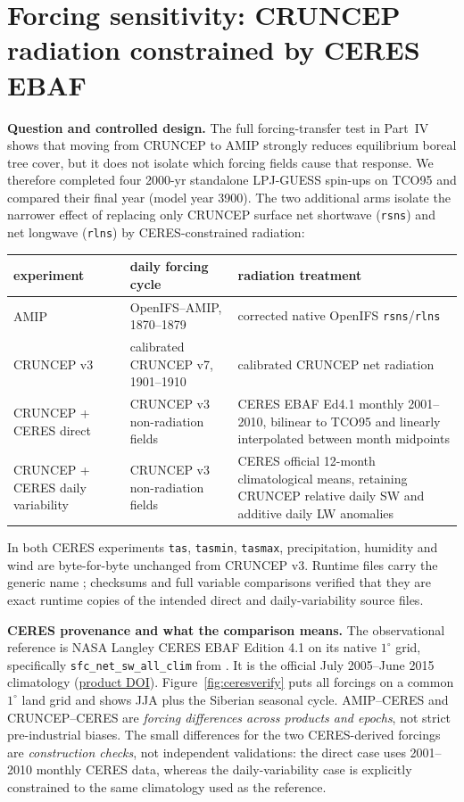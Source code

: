 \documentclass[10pt]{article}
\begin{document}
\section{Forcing sensitivity: CRUNCEP radiation constrained by CERES EBAF}\label{sec:ceresforcing}
\textbf{Question and controlled design.} The full forcing-transfer test in Part~IV shows that moving from
CRUNCEP to AMIP strongly reduces equilibrium boreal tree cover, but it does not isolate which forcing fields cause
that response. We therefore completed four 2000-yr standalone LPJ-GUESS spin-ups on TCO95 and compared their
final year (model year 3900). The two additional arms isolate the narrower effect of replacing only CRUNCEP
surface net shortwave (\texttt{rsns}) and net longwave (\texttt{rlns}) by CERES-constrained radiation:
\begin{center}\small
\begin{tabular}{p{} p{} p{}}
\toprule
experiment & daily forcing cycle & radiation treatment \\
\midrule
AMIP & OpenIFS--AMIP, 1870--1879 & corrected native OpenIFS \texttt{rsns}/\texttt{rlns} \\
CRUNCEP v3 & calibrated CRUNCEP v7, 1901--1910 & calibrated CRUNCEP net radiation \\
CRUNCEP + CERES direct & CRUNCEP v3 non-radiation fields & CERES EBAF Ed4.1 monthly 2001--2010, bilinear to TCO95 and linearly interpolated between month midpoints \\
CRUNCEP + CERES daily variability & CRUNCEP v3 non-radiation fields & CERES official 12-month climatological means, retaining CRUNCEP relative daily SW and additive daily LW anomalies \\
\bottomrule
\end{tabular}
\end{center}
In both CERES experiments \texttt{tas}, \texttt{tasmin}, \texttt{tasmax}, precipitation, humidity and wind are
byte-for-byte unchanged from CRUNCEP v3. Runtime files carry the generic name
; checksums and full variable comparisons verified
that they are exact runtime copies of the intended direct and daily-variability source files.

\textbf{CERES provenance and what the comparison means.} The observational reference is NASA Langley CERES EBAF
Edition 4.1 on its native $1^\circ$ grid, specifically
\texttt{sfc\_net\_sw\_all\_clim} from
. It is the official July 2005--June 2015 climatology
(\href{https://doi.org/10.5067/TERRA-AQUA/CERES/EBAF_L3B004.1}{product DOI}).
Figure~\ref{fig:ceresverify} puts all forcings on a common
$1^\circ$ land grid and shows JJA plus the Siberian seasonal cycle. AMIP--CERES and CRUNCEP--CERES are
\emph{forcing differences across products and epochs}, not strict pre-industrial biases. The small differences
for the two CERES-derived forcings are \emph{construction checks}, not independent validations: the direct case
uses 2001--2010 monthly CERES data, whereas the daily-variability case is explicitly constrained to the same
climatology used as the reference.
\end{document}
